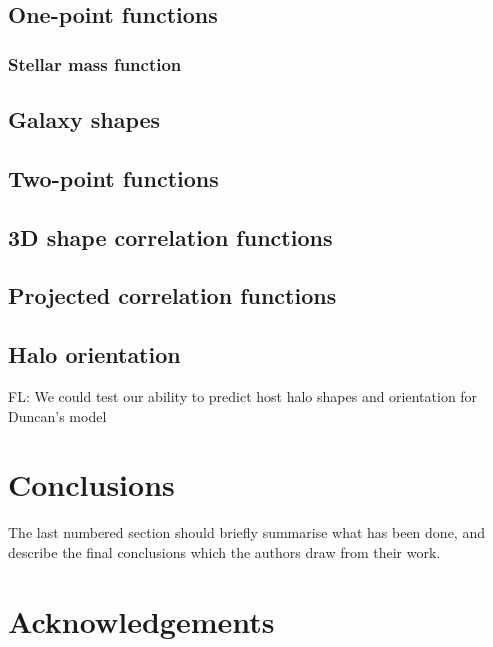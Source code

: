 \documentclass[a4paper,fleqn,usenatbib]{mnras}
\newcommand{\fl}[1]{{\color{magenta}FL: #1}}
\begin{document}
\subsection{One-point functions}

	\subsubsection{Stellar mass function}

	\subsection{Galaxy shapes}

\subsection{Two-point functions}

	\subsection{3D shape correlation functions}

	\subsection{Projected correlation functions}

\subsection{Halo orientation}

\fl{We could test our ability to predict host halo shapes and orientation for Duncan's model}

\section{Conclusions}


The last numbered section should briefly summarise what has been done, and describe
the final conclusions which the authors draw from their work.

\section*{Acknowledgements}

\end{document}
